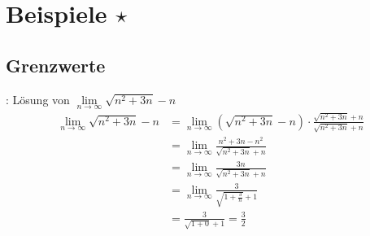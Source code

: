 \section{Beispiele \texorpdfstring{$\star$}{*}}

\subsection{Grenzwerte}
\Bsp {}: Lösung von $\lim\limits_{n\to\infty} \sqrt{n^2 + 3n} - n$
\begin{align*}
    \lim\limits_{n\to\infty} \sqrt{n^2 + 3n} - n &=\lim\limits_{n\to\infty} (\sqrt{n^2 + 3n} - n) \cdot \frac{\sqrt{n^2 + 3n} + n}{\sqrt{n^2 + 3n} + n} \\[-0.6em]
        &= \lim\limits_{n\to\infty} \frac{n^2 + 3n - n^2}{\sqrt{n^2 + 3n} + n} \\[-0.2em]
        &= \lim\limits_{n\to\infty} \frac{3n}{\sqrt{n^2 + 3n} + n} \\[-.3em]
        &= \lim\limits_{n\to\infty} \frac{3}{\sqrt{1 + \frac{3}{n}} + 1} \\[-.3em]
        &= \frac{3}{\sqrt{1 + 0} + 1} = \frac{3}{2}
\end{align*}

